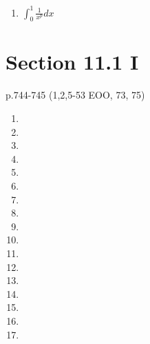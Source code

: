 \documentclass[12pt]{article}
\begin{document}
\begin{enumerate}
    \begin{align*}
        \int_0^\infty\frac{1}{\sqrt{x}(1+x)}dx = && 
        \int_0^1\frac{1}{\sqrt{x}(1+x)}dx + 
        \int_1^\infty\frac{1}{\sqrt{x}(1+x)}dx
    \end{align*}
    \addtocounter{enumi}{1}\item $\int_0^1\frac{1}{x^p}dx$
\end{enumerate}

\newpage\section{Section 11.1 I}
p.744-745 (1,2,5-53 EOO, 73, 75)
\begin{enumerate}
    \item 
    \item
    \addtocounter{enumi}{2}\item
    \addtocounter{enumi}{3}\item
    \addtocounter{enumi}{3}\item
    \addtocounter{enumi}{3}\item
    \addtocounter{enumi}{3}\item
    \addtocounter{enumi}{3}\item
    \addtocounter{enumi}{3}\item
    \addtocounter{enumi}{3}\item
    \addtocounter{enumi}{3}\item
    \addtocounter{enumi}{3}\item
    \addtocounter{enumi}{3}\item
    \addtocounter{enumi}{3}\item
    \addtocounter{enumi}{3}\item
    \addtocounter{enumi}{19}\item
    \addtocounter{enumi}{1}\item
    
    
\end{enumerate}
\end{document}
